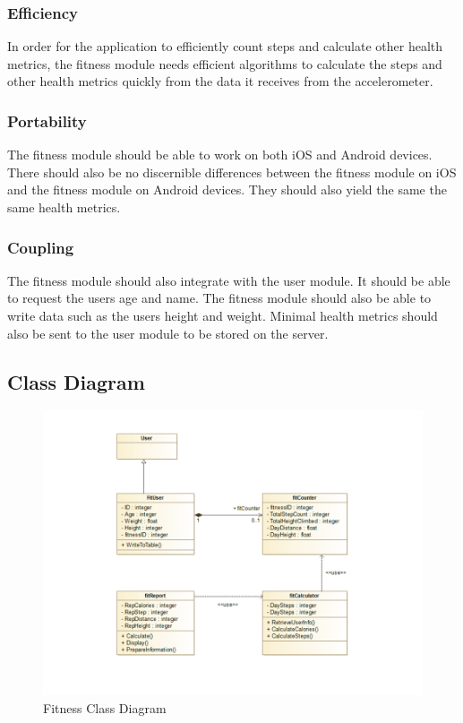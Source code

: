 \subsubsection{Efficiency} 
In order for the application to efficiently count steps and calculate other health metrics, the fitness module needs efficient algorithms to calculate the steps and other health metrics quickly from the data it receives from the accelerometer.  

\subsubsection{Portability} 
The fitness module should be able to work on both iOS and Android devices. There should also be no discernible differences between the fitness module on iOS and the fitness module on Android devices. They should also yield the same the same health metrics. 

\subsubsection{Coupling} 
The fitness module should also integrate with the user module. It should be able to request the users age and name. The fitness module should also be able to write data such as the users height and weight. Minimal health metrics should also be sent to the user module to be stored on the server. 

\subsection{Class Diagram}
\begin{figure}[H]
	\centering
	\includegraphics[scale=0.44]{Fitness/fitness_class_diagram.png}
	\caption{Fitness Class Diagram}
	\label{fig:Fitness_Class_Diagram}
\end{figure}

